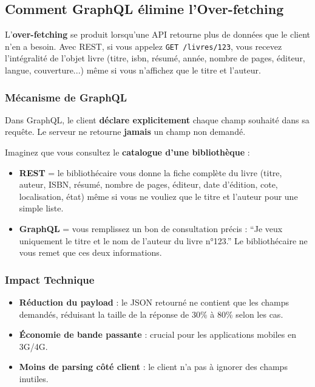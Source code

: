 \documentclass[12pt,a4paper]{article}
\begin{document}
\subsection{Comment GraphQL élimine l'Over-fetching}

\begin{infobox}[title={Définition : Over-fetching}]
L'\textbf{over-fetching} se produit lorsqu'une API retourne plus de données que le client n'en a besoin. Avec REST, si vous appelez \texttt{GET /livres/123}, vous recevez l'intégralité de l'objet livre (titre, isbn, résumé, année, nombre de pages, éditeur, langue, couverture...) même si vous n'affichez que le titre et l'auteur.
\end{infobox}

\subsubsection{Mécanisme de GraphQL}

Dans GraphQL, le client \textbf{déclare explicitement} chaque champ souhaité dans sa requête. Le serveur ne retourne \textbf{jamais} un champ non demandé.

\begin{analogybox}
Imaginez que vous consultez le \textbf{catalogue d'une bibliothèque} :
\begin{itemize}
    \item \textbf{REST} = le bibliothécaire vous donne la fiche complète du livre (titre, auteur, ISBN, résumé, nombre de pages, éditeur, date d'édition, cote, localisation, état) même si vous ne vouliez que le titre et l'auteur pour une simple liste.
    \item \textbf{GraphQL} = vous remplissez un bon de consultation précis : ``Je veux uniquement le titre et le nom de l'auteur du livre n°123.'' Le bibliothécaire ne vous remet que ces deux informations.
\end{itemize}
\end{analogybox}

\subsubsection{Impact Technique}

\begin{itemize}[leftmargin=1.5cm]
    \item \textbf{Réduction du payload} : le JSON retourné ne contient que les champs demandés, réduisant la taille de la réponse de 30\% à 80\% selon les cas.
    \item \textbf{Économie de bande passante} : crucial pour les applications mobiles en 3G/4G.
    \item \textbf{Moins de parsing côté client} : le client n'a pas à ignorer des champs inutiles.
\end{itemize}
\end{document}
